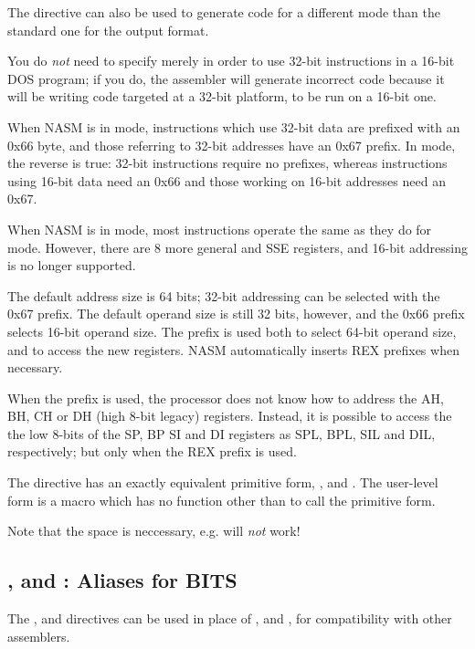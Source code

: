 The  directive can also be used to generate code for
a different mode than the standard one for the output format.

You do \emph{not} need to specify  merely in order
to use 32-bit instructions in a 16-bit DOS program; if you do, the
assembler will generate incorrect code because it will be writing
code targeted at a 32-bit platform, to be run on a 16-bit one.

When NASM is in  mode, instructions which use 32-bit
data are prefixed with an 0x66 byte, and those referring to 32-bit
addresses have an 0x67 prefix. In  mode, the reverse is
true: 32-bit instructions require no prefixes, whereas instructions
using 16-bit data need an 0x66 and those working on 16-bit
addresses need an 0x67.

When NASM is in  mode, most instructions operate the same
as they do for  mode. However, there are 8 more general and
SSE registers, and 16-bit addressing is no longer supported.

The default address size is 64 bits; 32-bit addressing can be selected
with the 0x67 prefix. The default operand size is still 32 bits,
however, and the 0x66 prefix selects 16-bit operand size.
The  prefix is used both to select 64-bit operand size, and
to access the new registers. NASM automatically inserts REX prefixes
when necessary.

When the  prefix is used, the processor does not know how to
address the AH, BH, CH or DH (high 8-bit legacy) registers. Instead,
it is possible to access the the low 8-bits of the SP, BP SI and DI
registers as SPL, BPL, SIL and DIL, respectively; but only when the
REX prefix is used.

The  directive has an exactly equivalent primitive form,
\code{[BITS 16]}, \code{[BITS 32]} and \code{[BITS 64]}. The user-level
form is a macro which has no function other than to call the primitive form.

Note that the space is neccessary, e.g.  will \emph{not} work!

\subsection{,  and : Aliases for BITS}
\label{subsec:use163264}

The ,  and  directives can be used
in place of ,  and , for
compatibility with other assemblers.

